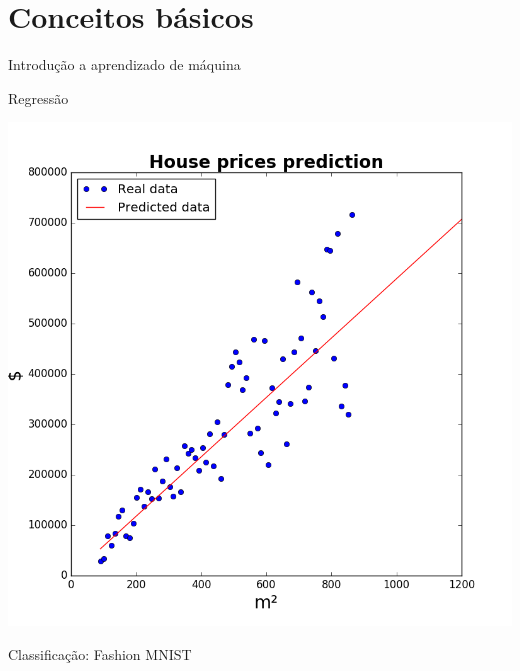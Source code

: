 \documentclass[10pt]{beamer}
\begin{document}
\nocite{DeepLearningbook}
\maketitle

\section{Conceitos básicos}

\begin{frame}{Introdução a aprendizado de máquina}

\end{frame}

\begin{frame}{Regressão}
\begin{center}
\includegraphics[scale=0.40]{images/house_prices.png}
\end{center}
\end{frame}


\begin{frame}{Classificação: Fashion MNIST \cite{xiao2017/online}}

\end{frame}
\end{document}
